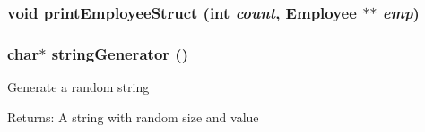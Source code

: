 \subsubsection{\setlength{\rightskip}{0pt plus 5cm}void print\-Employee\-Struct (int {\em count}, \bf{Employee} $\ast$$\ast$ {\em emp})}\label{employee_8c_06927df00f1150e177055b6bf59b8683}


\subsubsection{\setlength{\rightskip}{0pt plus 5cm}char$\ast$ string\-Generator ()}\label{employee_8c_1d49fd707de5e39732601ab0105d580a}


Generate a random string \begin{Desc}
\item[Returns:]A string with random size and value \end{Desc}
